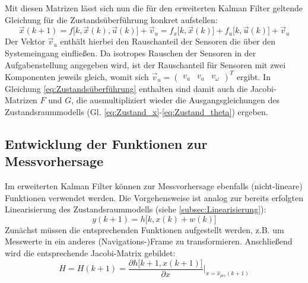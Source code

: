 \documentclass[12pt,a4paper]{article}
\begin{document}
	Mit diesen Matrizen lässt sich nun die für den erweiterten Kalman Filter geltende Gleichung für die Zustandsüberführung konkret aufstellen:
	\begin{equation}\label{eq:Zustandsüberführung}
		\vec{x}(k+1)=f\big[k,\vec{x}(k), \vec{u}(k)\big]+\vec{v}_{u}=f_{x}\big[k, \vec{x}(k)\big]+f_{u}\big[k, \vec{u}(k)\big]+\vec{v}_{u}
	\end{equation}
	Der Vektor $\vec{v}_{u}$ enthält hierbei den Rauschanteil der Sensoren die über den Systemeingang einfließen. Da isotropes Rauschen der Sensoren in der Aufgabenstellung angegeben wird, ist der Rauschanteil für Sensoren mit zwei Komponenten jeweils gleich, womit sich $\vec{v}_{u}=\begin{pmatrix} v_{a} & v_{a} & v_{\omega} \end{pmatrix}^{T}$ ergibt.
	In Gleichung \ref{eq:Zustandsüberführung} enthalten sind damit auch die Jacobi-Matrizen $F$ und $G$, die ausmultipliziert wieder die Ausgangsgleichungen des Zustandsraummodells (Gl. \ref{eq:Zustand_x}-\ref{eq:Zustand_theta}) ergeben.
	
	\subsection{Entwicklung der Funktionen zur Messvorhersage}\label{subsec:Messvorhersage}
	Im erweiterten Kalman Filter können zur Messvorhersage ebenfalls (nicht-lineare) Funktionen verwendet werden. Die Vorgehensweise ist analog zur bereits erfolgten Linearisierung des Zustandsraummodells (siehe \ref{subsec:Linearisierung}):
	\begin{equation}
		y(k+1)=h\big[k, x(k)+w(k)\big]
	\end{equation}
	Zunächst müssen die entsprechenden Funktionen aufgestellt werden, z.B. um Messwerte in ein anderes (Navigations-)Frame zu transformieren. Anschließend wird die entsprechende Jacobi-Matrix gebildet:
	\begin{equation}\label{eq:DefinitionMessvorhersageJacobiMatrix}
		H=H(k+1)=\frac{\partial h\big[k+1,x(k+1)\big]}{\partial x}\Bigg\vert_{x=\hat{x}_{pri}(k+1)}
	\end{equation}
\end{document}
